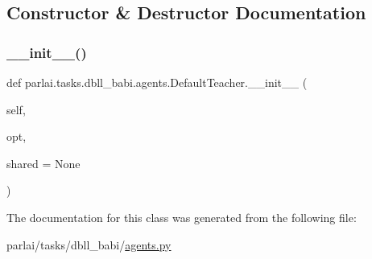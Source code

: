 \subsection{Constructor \& Destructor Documentation}
\mbox{\label{classparlai_1_1tasks_1_1dbll__babi_1_1agents_1_1DefaultTeacher_ab7d8ee5ef045a12162f79ec74898bca0}} 
\subsubsection{\texorpdfstring{\+\_\+\+\_\+init\+\_\+\+\_\+()}{\_\_init\_\_()}}
{\footnotesize\ttfamily def parlai.\+tasks.\+dbll\+\_\+babi.\+agents.\+Default\+Teacher.\+\_\+\+\_\+init\+\_\+\+\_\+ (\begin{DoxyParamCaption}\item[{}]{self,  }\item[{}]{opt,  }\item[{}]{shared = {\ttfamily None} }\end{DoxyParamCaption})}



The documentation for this class was generated from the following file\+:\begin{DoxyCompactItemize}
\item 
parlai/tasks/dbll\+\_\+babi/\hyperlink{parlai_2tasks_2dbll__babi_2agents_8py}{agents.\+py}\end{DoxyCompactItemize}
